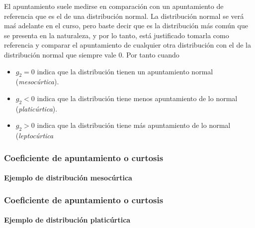 \begin{frame}
{El apuntamiento suele medirse en comparación con un apuntamiento de referencia que es el de una distribución normal. La distribución normal
se verá maś adelante en el curso, pero baste decir que es la distribución más común que se presenta en la naturaleza, y por lo tanto, está
justificado tomarla como referencia y comparar el apuntamiento de cualquier otra distribución con el de la distribución normal que siempre
vale 0. Por tanto cuando
\begin{itemize}
\item $g_2=0$ indica que la distribución tienen un apuntamiento normal (\emph{mesocúrtica}).
\item $g_2<0$ indica que la distribución tiene menos apuntamiento de lo normal (\emph{platicúrtica}).
\item $g_2>0$ indica que la distribución tiene más apuntamiento de lo normal (\emph{leptocúrtica}
\end{itemize}
}
\end{frame}


\begin{frame}
\frametitle{Coeficiente de apuntamiento o curtosis}
\framesubtitle{Ejemplo de distribución mesocúrtica}
\begin{center}
\scalebox{0.6}{}
\end{center}
\end{frame}


\begin{frame}
\frametitle{Coeficiente de apuntamiento o curtosis}
\framesubtitle{Ejemplo de distribución platicúrtica}
\begin{center}
\scalebox{0.6}{}
\end{center}
\end{frame}


